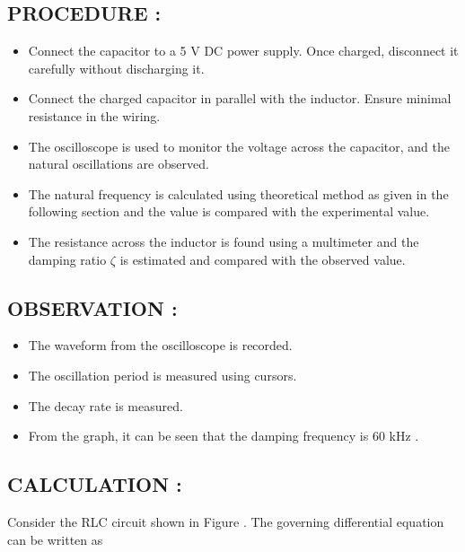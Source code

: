 \documentclass[12pt]{article}
\begin{document}
\subsection{\textbf{PROCEDURE : }}
\begin{itemize}
\item Connect the capacitor to a 5 V DC power supply. Once charged, disconnect it carefully without discharging it.
\item Connect the charged capacitor in parallel with the inductor. Ensure minimal resistance in the wiring.
\item The oscilloscope is used to monitor the voltage across the capacitor, and the natural oscillations are observed.
\item The natural frequency is calculated using theoretical method as given in the following section and the value is compared with the experimental value. 
\item The resistance across the inductor is found using a multimeter and the damping ratio $\zeta$ is estimated and compared with the observed value.
\end{itemize}

\subsection{\textbf{OBSERVATION : }}
\begin{itemize}
\item The waveform from the oscilloscope is recorded.
\item The oscillation period is measured using cursors.
\item The decay rate is measured.
\item From the graph, it can be seen that the damping frequency is 60 kHz .
\end{itemize}

\subsection{\textbf{CALCULATION : }}
Consider the RLC circuit shown in Figure . The governing differential equation can be written as \\
\end{document}
